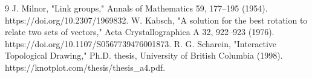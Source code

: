 \begin{thebibliography}{9}
 J. Milnor, "Link groups," Annals of Mathematics 59, 177--195 (1954). https://doi.org/10.2307/1969832.
 W. Kabsch, "A solution for the best rotation to relate two sets of vectors," Acta Crystallographica A 32, 922--923 (1976). https://doi.org/10.1107/S0567739476001873.
 R. G. Scharein, "Interactive Topological Drawing," Ph.D. thesis, University of British Columbia (1998). https://knotplot.com/thesis/thesis_a4.pdf.
\end{thebibliography}
